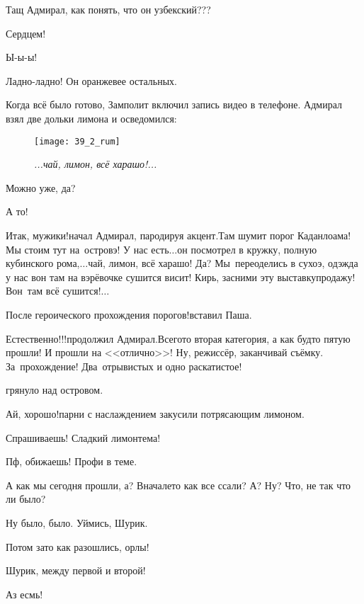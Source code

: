 \diagdash Тащ Адмирал, как понять, что он узбекский???

\diagdash Сердцем!

\diagdash Ы-ы-ы!

\diagdash Ладно-ладно! Он оранжевее остальных.

Когда всё было готово, Замполит включил запись видео в телефоне. Адмирал взял две дольки лимона и осведомился:

\begin{wrapfigure}[17]{r}{0.5\textwidth}
	\centering
	\texttt{[image: 39\_2\_rum]}
	\caption{\small\textit{...чай, лимон, всё харашо!...}}
\end{wrapfigure}
\diagdash Можно уже, да?

\diagdash А то!

\diagdash Итак, мужики!\mdash начал Адмирал, пародируя акцент.\mdash Там шумит порог Каданлоама! Мы стоим тут на~островэ! У нас есть$\ldots$\mdash он посмотрел в кружку, полную кубинского рома,\mdash $\ldots$чай, лимон, всё харашо! Да? Мы~переоделись в сухоэ, одэжда у нас вон там на вэрёвочке сушится висит! Кирь, засними эту выставку\sdash продажу! Вон~там всё сушится!$\ldots$


\diagdash После героического прохождения порогов!\mdash вставил Паша.

\diagdash Естественно!!!\mdash продолжил Адмирал.\mdash Всего\sdash то вторая категория, а как будто пятую прошли! И прошли на <<отлично>>! Ну, режиссёр, заканчивай съёмку. За~прохождение! Два~отрывистых и одно раскатистое!

\mdash грянуло над островом.

\diagdash Ай, хорошо!\mdash парни с наслаждением закусили потрясающим лимоном.

\diagdash Спрашиваешь! Сладкий лимон\mdash тема!

\diagdash Пф, обижаешь! Профи в теме.

\diagdash А как мы сегодня прошли, а? Вначале\sdash то как все ссали? А? Ну? Что, не так что ли было?

\diagdash Ну было, было. Уймись, Шурик.

\diagdash Потом зато как разошлись, орлы!

\diagdash Шурик, между первой и второй!

\diagdash Аз есмь!

